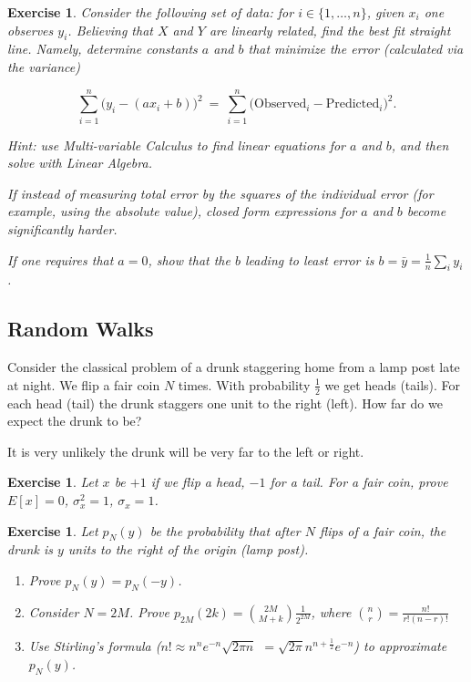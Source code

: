 \documentclass[12pt,letterpaper]{report}
\newcommand\be{\begin{equation}}
\newcommand\ee{\end{equation}}
\newcommand\ben{\begin{enumerate}}
\newcommand\een{\end{enumerate}}
\newcommand{\foh}{\frac{1}{2}}  %
\newtheorem{exe}[thm]{Exercise}
\begin{document}
\begin{exe} Consider the following set of data: for $i \in \{1,
\dots, n\}$, given $x_i$ one observes $y_i$. Believing that $X$
and $Y$ are linearly related, find the best fit straight line.
Namely, determine constants $a$ and $b$ that minimize the error
(calculated via the variance)

\be \sum_{i=1}^n \Big(y_i - (ax_i + b) \Big)^2 \ = \ \sum_{i=1}^n
\Big(\mbox{Observed}_i - \mbox{Predicted}_i\Big)^2. \ee

Hint: use Multi-variable Calculus to find linear equations for $a$
and $b$, and then solve with Linear Algebra.

If instead of measuring total error by the squares of the
individual error (for example, using the absolute value), closed
form expressions for $a$ and $b$ become significantly harder.

If one requires that $a = 0$, show that the $b$ leading to least
error is $b = \bar{y} = \frac{1}{n} \sum_i y_i$.

\end{exe}

\subsection{Random Walks}

Consider the classical problem of a drunk staggering home from a
lamp post late at night. We flip a fair coin $N$ times. With
probability $\foh$ we get heads (tails). For each head (tail) the
drunk staggers one unit to the right (left). How far do we expect
the drunk to be?

It is very unlikely the drunk will be very far to the left or
right.

\begin{exe} Let $x$ be $+1$ if we flip a head, $-1$ for a tail.
For a fair coin, prove $E[x] = 0$, $\sigma^2_x = 1$, $\sigma_x =
1$.
\end{exe}

\begin{exe} Let $p_N(y)$ be the probability that after $N$ flips of
a fair coin, the drunk is $y$ units to the right of the origin
(lamp post).

\ben

\item Prove $p_N(y) = p_N(-y)$.

\item Consider $N = 2M$. Prove $p_{2M}(2k) = {2M \choose M + k}
\frac{1}{2^{2M}}$, where ${n \choose r}  = \frac{n!}{r!(n-r)!} $

\item Use Stirling's formula ($n! \approx n^n e^{-n}\sqrt{2\pi
n}$ $= \sqrt{2\pi} n^{n+\foh} e^{-n}$) to approximate $p_N(y)$.

\een
\end{exe}
\end{document}
